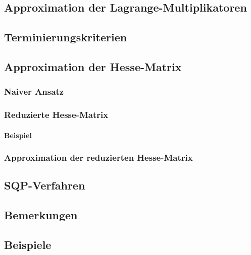 		\subsection{Approximation der Lagrange-Multiplikatoren} %

		\subsection{Terminierungskriterien} %

		\subsection{Approximation der Hesse-Matrix} %

			\subsubsection{Naiver Ansatz} %

			\subsubsection{Reduzierte Hesse-Matrix} %

				\paragraph{Beispiel} %

			\subsubsection{Approximation der reduzierten Hesse-Matrix} %

		\subsection{SQP-Verfahren} %

		\subsection{Bemerkungen} %

		\subsection{Beispiele} %

